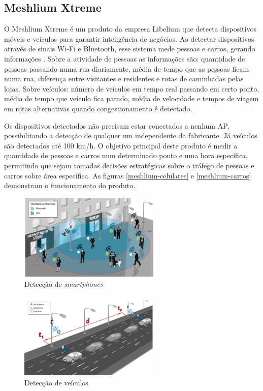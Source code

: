 \subsection{Meshlium Xtreme}
O Meshlium Xtreme é um produto da empresa Libelium
que detecta dispositivos móveis e veículos para garantir inteligência de
negócios. Ao detectar dispositivos através de sinais Wi-Fi e Bluetooth, esse
sistema mede pessoas e carros, gerando informações \cite{libelium}. Sobre a
atividade de pessoas as informações são: quantidade de pessoas passando numa rua
diariamente, média de tempo que as pessoas ficam numa rua, diferença entre
visitantes e residentes e rotas de caminhadas pelas lojas. Sobre veículos:
número de veículos em tempo real passando em certo ponto, média de tempo que
veículo fica parado, média de velocidade e tempos de viagem em rotas
alternativas quando congestionamento é detectado.

Os dispositivos detectados não precisam
estar conectados a nenhum AP, possibilitando a detecção de qualquer um
independente da fabricante. Já veículos são detectados até 100 km/h. O objetivo
principal deste produto é medir a quantidade de pessoas e carros num determinado
ponto e uma hora específica, permitindo que sejam tomadas decisões estratégicas
sobre o tráfego de pessoas e carros sobre área específica. As figuras
\autoref{meshlium-celulares} e \autoref{meshlium-carros} demonstram o
funcionamento do produto.

\begin{figure}[htb]
  \caption{\label{meshlium-celulares}Detecção de \emph{smartphones}}
  \begin{center}
    \includegraphics[width=0.60\textwidth]{img/meshlium-celulares.png}
  \end{center}
\end{figure}

\begin{figure}[htb]
  \caption{\label{meshlium-carros}Detecção de veículos}
  \begin{center}
    \includegraphics[width=0.60\textwidth]{img/meshlium-carros.png}
  \end{center}
\end{figure}

